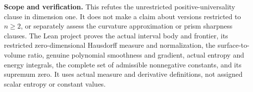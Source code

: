 \documentclass[11pt]{article}
\begin{document}
\noindent\textbf{Scope and verification.} This refutes the unrestricted positive-universality clause in dimension one. It does not make a claim about versions restricted to $n\geq2$, or separately assess the curvature approximation or prism sharpness clauses. The Lean project proves the actual interval body and frontier, its restricted zero-dimensional Hausdorff measure and normalization, the surface-to-volume ratio, genuine polynomial smoothness and gradient, actual entropy and energy integrals, the complete set of admissible nonnegative constants, and its supremum zero. It uses actual measure and derivative definitions, not assigned scalar entropy or constant values.
\end{document}
